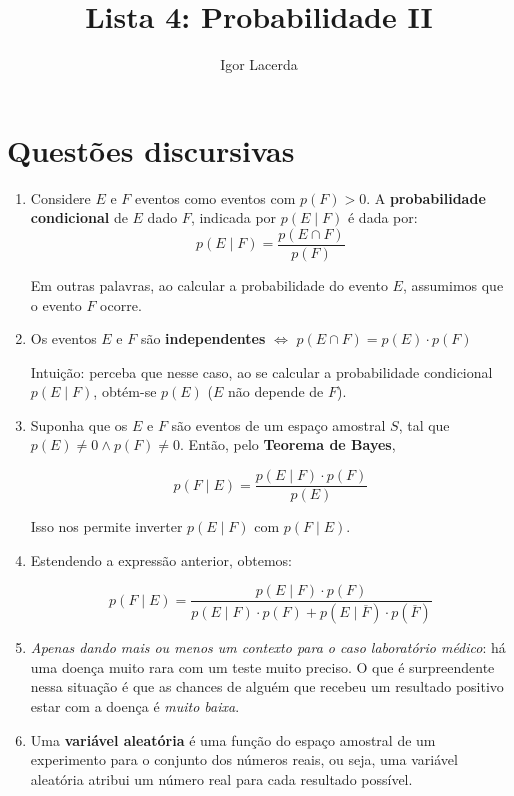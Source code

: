 \documentclass{article}
\title{Lista 4: Probabilidade II}
\author{Igor Lacerda}
\begin{document}
\maketitle
\section*{Questões discursivas}
\begin{enumerate}

    \item Considere \( E \) e \( F \) eventos como eventos com \( p(F) > 0 \). A \textbf{probabilidade condicional} de \( E \) dado \( F \), indicada por \( p(E \mid F) \) é dada por:
        \[ p(E \mid F) = \frac{p(E \cap F)}{p(F)} \]

        Em outras palavras, ao calcular a probabilidade do evento \( E \), assumimos que o evento \( F \) ocorre.

    \item Os eventos \( E \) e \( F \) são \textbf{independentes} \( \iff \) \( p(E \cap F) = p(E) \cdot p(F) \)

        Intuição: perceba que nesse caso, ao se calcular a probabilidade condicional \( p(E \mid F) \), obtém-se \( p(E) \) (\( E \) não depende de \( F \)).

    \item Suponha que os \( E \) e \( F \) são eventos de um espaço amostral \( S \), tal que \( p(E) \neq 0 \land p(F) \neq 0 \). Então, pelo \textbf{Teorema de Bayes},

        \[ p(F \mid E) = \frac{p(E \mid F) \cdot p(F)}{p(E)} \] 

        Isso nos permite inverter \( p(E \mid F) \) com \( p(F \mid E) \).

    \item Estendendo a expressão anterior, obtemos:

        \[ p(F \mid E) = \frac{p(E \mid F) \cdot p(F)}{{p(E \mid F) \cdot p(F) + p(E \mid \overline{F}) \cdot p(\overline{F})}} \] 

    \item \textit{Apenas dando mais ou menos um contexto para o caso laboratório médico}: há uma doença muito rara com um teste muito preciso. O que é surpreendente nessa situação é que as chances de alguém que recebeu um resultado positivo estar com a doença é \textit{muito baixa}.

    \item Uma \textbf{variável aleatória} é uma função do espaço amostral de um experimento para o conjunto dos números reais, ou seja, uma variável aleatória atribui um número real para cada resultado possível.


\end{enumerate}
\end{document}
